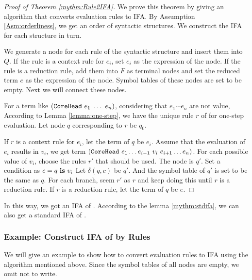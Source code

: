 \begin{proof}[Proof of Theorem \ref{mythm:Rule2IFA}]

We prove this theorem by giving an algorithm that converts evaluation rules to IFA. By Assumption \ref{Asm:orderliness}, we get an order of syntactic structures. We construct the IFA for each structure in turn.

We generate a node for each rule of the syntactic structure  and insert them into $Q$. If the rule is a context rule for $e_i$, set $e_i$ as the expression of the node. If the rule is a reduction rule, add them into $F$ as terminal nodes and set the reduced term $e$ as the expression of the node. Symbol tables of these nodes are set to be empty. Next we will connect these nodes.

For a term like $(\mbox{\tt CoreHead}~e_1~\ldots~e_n)$, considering that $e_1\cdots e_n$ are not value, According to Lemma \ref{lemma:one-step}, we have the unique rule $r$ of  for one-step evaluation. Let node $q$ corresponding to $r$ be $q_0$.

If $r$ is a context rule for $e_i$, let the term of $q$ be $e_i$. Assume that the evaluation of $e_i$ results in $v_i$, we get term $(\mbox{\tt CoreHead}~e_1 \ldots e_{i-1}~v_i~e_{i+1} \ldots e_n)$. For each possible value of $v_i$, choose the rules $r'$ that should be used. The node is $q'$. Set a condition as $c=q~\mbox{\rm \bf is}~v_i$ Let $\delta(q, c)$ be $q'$. And the symbol table of $q'$ is set to be the same as $q$. For each branch, seem $r'$ as $r$ and keep doing this until $r$ is a reduction rule. If $r$ is a reduction rule, let the term of $q$ be $e$.


\end{proof}

In this way, we got an IFA of . According to the lemma \ref{mythm:stdifa}, we can also get a standard IFA of . 

\subsubsection{Example: Construct IFA of  by Rules}

We will give an example to show how to convert evaluation rules to IFA using the algorithm mentioned above. Since the symbol tables of all nodes are empty, we omit not to write.

